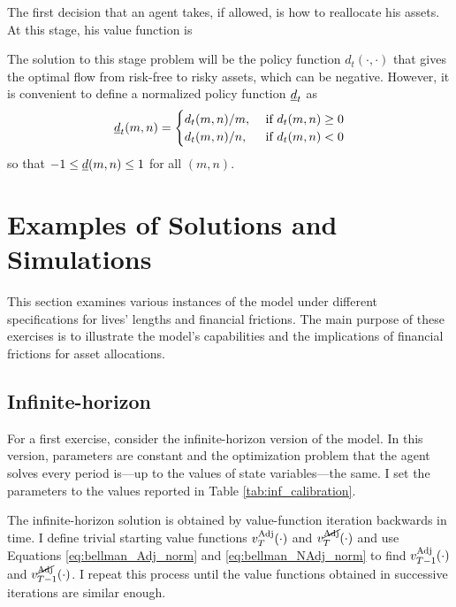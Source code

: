 \documentclass[./RiskyContrib.tex]{subfiles}
\begin{document}
The first decision that an agent takes, if allowed, is how to reallocate his
assets. At this stage, his value function is
\begin{equation}\label{eq:bellman_reb}

\end{equation}

The solution to this stage problem will be the policy function $d_t(\cdot, \cdot)$
that gives the optimal flow from risk-free to risky assets, which can be negative.
However, it is convenient to define a normalized policy function $\underline{d}_t$ as
\begin{equation*}
\underline{d}_t(m, n) = \begin{cases}
d_t(m,n)/m, & \text{ if } d_t(m,n) \geq 0 \\
d_t(m,n)/n, & \text{ if } d_t(m,n) < 0
\end{cases}
\end{equation*}
so that $-1 \leq \underline{d}(m,n) \leq 1$ for all $(m,n)$.

\hypertarget{Examples}{}
\section{Examples of Solutions and Simulations}

This section examines various instances of the model under
different specifications for lives' lengths and financial
frictions. The main purpose of these exercises is to illustrate
the model's capabilities and the implications of financial
frictions for asset allocations.

\subsection{Infinite-horizon}

For a first exercise, consider the infinite-horizon version of
the model. In this version, parameters are constant and the
optimization problem that the agent solves every period
is---up to the values of state variables---the same. I set
the parameters to the values reported in Table \ref{tab:inf_calibration}.



The infinite-horizon solution is obtained by value-function iteration
backwards in time. I define trivial starting value functions $v^{\text{Adj}}_T(\cdot)$
and $v^{\cancel{\text{Adj}}}_T(\cdot)$ and use Equations \ref{eq:bellman_Adj_norm} and
\ref{eq:bellman_NAdj_norm} to find $v^{\text{Adj}}_{T-1}(\cdot)$ and $v^{\cancel{\text{Adj}}}_{T-1}(\cdot)$.
I repeat this process until the value functions obtained in successive
iterations are similar enough.
\end{document}
